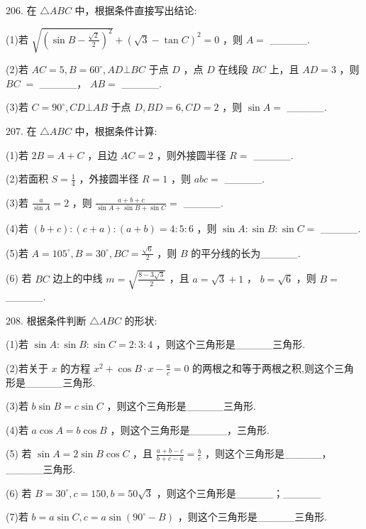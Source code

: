 \documentclass[10pt]{article}
\begin{document}
206. 在 \(\bigtriangleup  {ABC}\) 中，根据条件直接写出结论:

(1)若 \(\sqrt{{\left( \sin B - \frac{\sqrt{2}}{2}\right) }^{2}} + {\left( \sqrt{3} - \tan C\right) }^{2} = 0\) ，则 \(A =\) \_\_\_\_\_.

(2)若 \({AC} = 5,B = {60}^{ \circ  },{AD}\bot {BC}\) 于点 \(D\) ，点 \(D\) 在线段 \({BC}\) 上，且 \({AD} = 3\) ，则 \({BC} \; =\) \_\_\_\_\_， \({AB} =\) \_\_\_\_\_.

(3)若 \(C = {90}^{ \circ  },{CD}\bot {AB}\) 于点 \(D,{BD} = 6,{CD} = 2\) ，则 \(\sin A =\) \_\_\_\_\_.

207. 在 \(\bigtriangleup  {ABC}\) 中，根据条件计算:

(1)若 \({2B} = A + C\) ，且边 \({AC} = 2\) ，则外接圆半径 \(R =\) \_\_\_\_\_.

(2)若面积 \(S = \frac{1}{4}\) ，外接圆半径 \(R = 1\) ，则 \({abc} =\) \_\_\_\_\_.

(3)若 \(\frac{a}{\sin A} = 2\) ，则 \(\frac{a + b + c}{\sin A + \sin B + \sin C} =\) \_\_\_\_\_.

(4)若 \(\left( {b + c}\right)  : \left( {c + a}\right)  : \left( {a + b}\right)  = 4 : 5 : 6\) ，则 \(\sin A : \sin B : \sin C =\) \_\_\_\_\_.

(5)若 \(A = {105}^{ \circ  },B = {30}^{ \circ  },{BC} = \frac{\sqrt{6}}{2}\) ，则 \(B\) 的平分线的长为\_\_\_\_\_.

(6) 若 \({BC}\) 边上的中线 \(m = \sqrt{\frac{8 - 3\sqrt{3}}{2}}\) ，且 \(a = \sqrt{3} + 1\) ， \(b = \sqrt{6}\) ，则 \(B =\) \_\_\_\_\_.

208. 根据条件判断 \(\bigtriangleup {ABC}\) 的形状:

(1)若 \(\sin A : \sin B : \sin C = 2 : 3 : 4\) ，则这个三角形是\_\_\_\_\_三角形.

(2)若关于 \(x\) 的方程 \({x}^{2} + \cos B \cdot  x - \frac{a}{c} = 0\) 的两根之和等于两根之积,则这个三角形是\_\_\_\_\_三角形.

(3)若 \(b\sin B = c\sin C\) ，则这个三角形是\_\_\_\_\_三角形.

(4)若 \(a\cos A = b\cos B\) ，则这个三角形是\_\_\_\_\_，三角形.

(5) 若 \(\sin A = 2\sin B\cos C\) ，且 \(\frac{a + b - c}{b + c - a} = \frac{b}{c}\) ，则这个三角形是\_\_\_\_\_，\_\_\_\_\_三角形.

(6) 若 \(B = {30}^{ \circ  },c = {150},b = {{50}\sqrt{3}}\) ，则这个三角形是\_\_\_\_\_；\_\_\_\_\_

(7)若 \(b = a\sin C,c = a\sin \left( {{90}^{ \circ  } - B}\right)\) ，则这个三角形是\_\_\_\_\_三角形.
\end{document}
